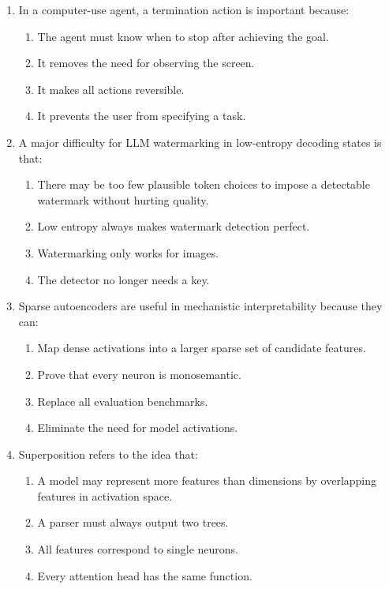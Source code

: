 \documentclass[11pt,a4paper]{article}
\begin{document}
\begin{enumerate}[leftmargin=*]
\begin{enumerate}
\item In a computer-use agent, a termination action is important because:
\begin{enumerate}[label=\Alph*.]
\item The agent must know when to stop after achieving the goal.
\item It removes the need for observing the screen.
\item It makes all actions reversible.
\item It prevents the user from specifying a task.
\end{enumerate}

\item A major difficulty for LLM watermarking in low-entropy decoding states is that:
\begin{enumerate}[label=\Alph*.]
\item There may be too few plausible token choices to impose a detectable watermark without hurting quality.
\item Low entropy always makes watermark detection perfect.
\item Watermarking only works for images.
\item The detector no longer needs a key.
\end{enumerate}

\item Sparse autoencoders are useful in mechanistic interpretability because they can:
\begin{enumerate}[label=\Alph*.]
\item Map dense activations into a larger sparse set of candidate features.
\item Prove that every neuron is monosemantic.
\item Replace all evaluation benchmarks.
\item Eliminate the need for model activations.
\end{enumerate}

\item Superposition refers to the idea that:
\begin{enumerate}[label=\Alph*.]
\item A model may represent more features than dimensions by overlapping features in activation space.
\item A parser must always output two trees.
\item All features correspond to single neurons.
\item Every attention head has the same function.
\end{enumerate}


\end{enumerate}
\end{enumerate}
\end{document}
